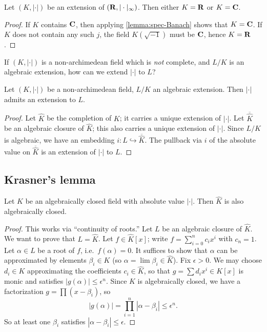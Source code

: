\begin{corollary}\label{cor:exts-of-R}
Let $(K,|\cdot|)$ be an extension of $(\mathbf{R},|\cdot|_\infty)$. Then either 
$K=\mathbf{R}$ or $K=\mathbf{C}$. 
\end{corollary}
\begin{proof}
If $K$ contains $\mathbf{C}$, then applying \autoref{lemma:spec-Banach} shows that 
$K=\mathbf{C}$. If $K$ does not contain any such $j$, the field $K(\sqrt{-1})$ must be 
$\mathbf{C}$, hence $K=\mathbf{R}$. 
\end{proof}

If $(K,|\cdot|)$ is a non-archimedean field which is \emph{not} complete, and 
$L/K$ is an algebraic extension, how can we extend $|\cdot|$ to $L$? 

\begin{theorem}
Let $(K,|\cdot|)$ be a non-archimedean field, $L/K$ an algebraic extension. 
Then $|\cdot|$ admits an extension to $L$. 
\end{theorem}
\begin{proof}
Let $\widehat K$ be the completion of $K$; it carries a unique extension 
of $|\cdot|$. Let $\overline{\widehat K}$ be an algebraic closure of 
$\widehat K$; this also carries a unique extension of $|\cdot|$. Since $L/K$ is 
algebraic, we have an embedding $i:L\hookrightarrow \overline{\widehat K}$. The 
pullback via $i$ of the absolute value on $\overline{\widehat K}$ is an 
extension of $|\cdot|$ to $L$. 
\end{proof}


\subsection{Krasner's lemma}

\begin{theorem}[Krasner]\label{thm:krasner}
Let $K$ be an algebraically closed field with absolute value $|\cdot|$. Then 
$\widehat K$ is also algebraically closed. 
\end{theorem}
\begin{proof}
This works via ``continuity of roots.'' Let $L$ be an algebraic closure of 
$\widehat K$. We want to prove that $L=\widehat K$. Let $f\in \widehat K[x]$; 
write $f=\sum_{i=0}^n c_i x^i$ with $c_n=1$. Let $\alpha\in L$ be a root of 
$f$, i.e.~$f(\alpha)=0$. It suffices to show that $\alpha$ can be approximated 
by elements $\beta_i\in K$ (so $\alpha=\lim \beta_i\in \widehat K$). Fix 
$\epsilon>0$. We may choose $d_i\in K$ approximating the coefficients 
$c_i\in \widehat K$, so that $g=\sum d_i x^i\in K[x]$ is monic and satisfies 
$|g(\alpha)|\leqslant \epsilon^n$. Since $K$ is algebraically closed, we have a 
factorization $g=\prod (x-\beta_i)$, so 
\[
  |g(\alpha)| = \prod_{i=1}^n |\alpha-\beta_i| \leqslant \epsilon^n .
\]
So at least one $\beta_i$ satisfies $|\alpha-\beta_i|\leqslant \epsilon$. 
\end{proof}

